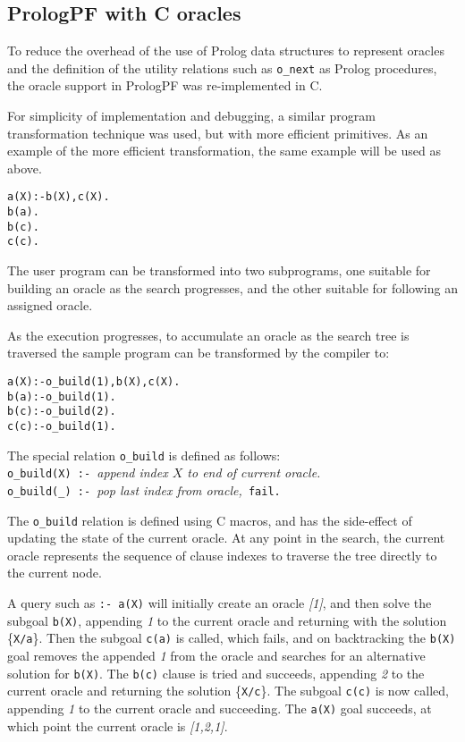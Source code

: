 \subsection{PrologPF with C oracles}
\label{c_macros}

To reduce the overhead of the use of Prolog data structures to represent
oracles and the definition of the utility relations such as \texttt{o\_{}next} as
Prolog procedures, the oracle support in PrologPF was re-implemented in C.

For simplicity of implementation and debugging, a similar program
transformation technique was used, but with more efficient primitives.
As an example of the more efficient transformation, the same example will
be used as above.
\begin{alltt}
a(X) :- b(X), c(X).\vspace{2mm}
b(a).
b(c).\vspace{2mm}
c(c).
\end{alltt}
The user program can be transformed into two subprograms, one suitable for
building an oracle as the search progresses, and the other suitable for
following an assigned oracle.

As the execution progresses, to accumulate an oracle as the search tree is traversed the
sample program can be transformed by the compiler to:
\begin{alltt}
% BUILD code \vspace{2mm}
a(X) :- o_build(1), b(X), c(X).\vspace{2mm}
b(a) :- o_build(1).
b(c) :- o_build(2).\vspace{2mm}
c(c) :- o_build(1).
\end{alltt}

The special relation \texttt{o\_{}build} is defined as follows:\\

\texttt{o\_{}build(X) :- }\textit{append index $X$ to end of current oracle.}\\
\texttt{o\_{}build(\_{}) :- }\textit{pop last index from oracle,}\texttt{ fail.}

The \texttt{o\_{}build} relation is defined using C macros, and has the side-effect of
updating the state of the current oracle.  At any point in the search, the current oracle
represents the sequence of clause indexes to traverse the tree directly to the current
node.

A query such as \texttt{:- a(X)} will initially create an oracle \textit{[1]}, and then
solve the subgoal \texttt{b(X)}, appending \textit{1} to the current oracle and returning
with the solution \{\texttt{X/a}\}.  Then the subgoal \texttt{c(a)} is called, which fails,
and on backtracking the \texttt{b(X)} goal removes the appended \textit{1} from the oracle
and searches for an alternative solution for \texttt{b(X)}.  The \texttt{b(c)} clause is
tried and succeeds, appending \textit{2} to the current oracle and returning the solution
\{\texttt{X/c}\}.  The subgoal \texttt{c(c)} is now called, appending \textit{1} to the 
current oracle and succeeding.  The \texttt{a(X)} goal succeeds, at which point the current
oracle is \textit{[1,2,1]}.

